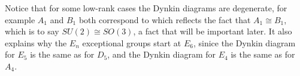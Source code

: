 \documentclass[fleqn]{NotesClass}
\begin{document}
    Notice that for some low-rank cases the Dynkin diagrams are degenerate, for example \(A_1\) and \(B_1\) both correspond to
    which reflects the fact that \(A_1 \cong B_1\), which is to say \(SU(2) \cong SO(3)\), a fact that will be important later.
    It also explains why the \(E_n\) exceptional groups start at \(E_6\), sinice the Dynkin diagram for \(E_5\) is the same as for \(D_5\), and the Dynkin diagram for \(E_4\) is the same as for \(A_4\).
    
    
    \appendixpage
    \begin{appendices}
        
        
        
        
    \end{appendices}
    
    \backmatter
    \renewcommand{\glossaryname}{Acronyms}
    \printglossary[acronym]
    \printindex
\end{document}
